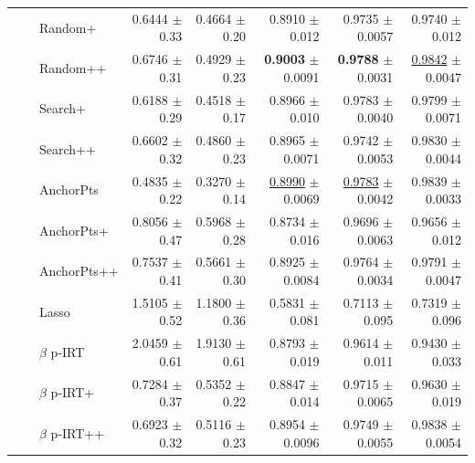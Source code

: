 \begin{longtable}{llp{}rrrrr}
 &  & Random+ & 0.6444 {\scriptsize $\pm$ 0.33} & 0.4664 {\scriptsize $\pm$ 0.20} & 0.8910 {\scriptsize $\pm$ 0.012} & 0.9735 {\scriptsize $\pm$ 0.0057} & 0.9740 {\scriptsize $\pm$ 0.012} \\
 &  & Random++ & 0.6746 {\scriptsize $\pm$ 0.31} & 0.4929 {\scriptsize $\pm$ 0.23} & \textbf{0.9003} {\scriptsize $\pm$ 0.0091} & \textbf{0.9788} {\scriptsize $\pm$ 0.0031} & \underline{0.9842} {\scriptsize $\pm$ 0.0047} \\
 &  & Search+ & 0.6188 {\scriptsize $\pm$ 0.29} & 0.4518 {\scriptsize $\pm$ 0.17} & 0.8966 {\scriptsize $\pm$ 0.010} & 0.9783 {\scriptsize $\pm$ 0.0040} & 0.9799 {\scriptsize $\pm$ 0.0071} \\
 &  & Search++ & 0.6602 {\scriptsize $\pm$ 0.32} & 0.4860 {\scriptsize $\pm$ 0.23} & 0.8965 {\scriptsize $\pm$ 0.0071} & 0.9742 {\scriptsize $\pm$ 0.0053} & 0.9830 {\scriptsize $\pm$ 0.0044} \\
 &  & AnchorPts & 0.4835 {\scriptsize $\pm$ 0.22} & 0.3270 {\scriptsize $\pm$ 0.14} & \underline{0.8990} {\scriptsize $\pm$ 0.0069} & \underline{0.9783} {\scriptsize $\pm$ 0.0042} & 0.9839 {\scriptsize $\pm$ 0.0033} \\
 &  & AnchorPts+ & 0.8056 {\scriptsize $\pm$ 0.47} & 0.5968 {\scriptsize $\pm$ 0.28} & 0.8734 {\scriptsize $\pm$ 0.016} & 0.9696 {\scriptsize $\pm$ 0.0063} & 0.9656 {\scriptsize $\pm$ 0.012} \\
 &  & AnchorPts++ & 0.7537 {\scriptsize $\pm$ 0.41} & 0.5661 {\scriptsize $\pm$ 0.30} & 0.8925 {\scriptsize $\pm$ 0.0084} & 0.9764 {\scriptsize $\pm$ 0.0034} & 0.9791 {\scriptsize $\pm$ 0.0047} \\
 &  & Lasso & 1.5105 {\scriptsize $\pm$ 0.52} & 1.1800 {\scriptsize $\pm$ 0.36} & 0.5831 {\scriptsize $\pm$ 0.081} & 0.7113 {\scriptsize $\pm$ 0.095} & 0.7319 {\scriptsize $\pm$ 0.096} \\
 &  & $\beta$ p-IRT & 2.0459 {\scriptsize $\pm$ 0.61} & 1.9130 {\scriptsize $\pm$ 0.61} & 0.8793 {\scriptsize $\pm$ 0.019} & 0.9614 {\scriptsize $\pm$ 0.011} & 0.9430 {\scriptsize $\pm$ 0.033} \\
 &  & $\beta$ p-IRT+ & 0.7284 {\scriptsize $\pm$ 0.37} & 0.5352 {\scriptsize $\pm$ 0.22} & 0.8847 {\scriptsize $\pm$ 0.014} & 0.9715 {\scriptsize $\pm$ 0.0065} & 0.9630 {\scriptsize $\pm$ 0.019} \\
 &  & $\beta$ p-IRT++ & 0.6923 {\scriptsize $\pm$ 0.32} & 0.5116 {\scriptsize $\pm$ 0.23} & 0.8954 {\scriptsize $\pm$ 0.0096} & 0.9749 {\scriptsize $\pm$ 0.0055} & 0.9838 {\scriptsize $\pm$ 0.0054} \\

\end{longtable}
